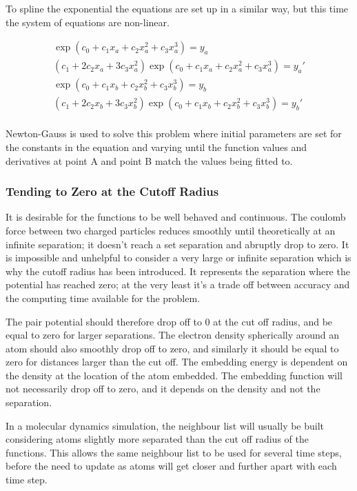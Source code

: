 To spline the exponential the equations are set up in a similar way, but this time the system of equations are non-linear.

\begin{equation}
\begin{split}
\exp(c_0 + c_1 x_a + c_2 x_a^2 + c_3 x_a^3) = y_a \\
(c_1 + 2 c_2 x_a + 3 c_3 x_a^2)\exp(c_0 + c_1 x_a + c_2 x_a^2 + c_3 x_a^3) = y_a' \\
\exp(c_0 + c_1 x_b + c_2 x_b^2 + c_3 x_b^3) = y_b \\
(c_1 + 2 c_2 x_b + 3 c_3 x_b^2)\exp(c_0 + c_1 x_b + c_2 x_b^2 + c_3 x_b^3) = y_b' \\
\end{split}
\label{eq:cubicExpSpline}
\end{equation}

Newton-Gauss is used to solve this problem where initial parameters are set for the constants in the equation and varying until the function values and derivatives at point A and point B match the values being fitted to.


\subsubsection{Tending to Zero at the Cutoff Radius}
\label{section:tendingtozero}

It is desirable for the functions to be well behaved and continuous.  The coulomb force between two charged particles reduces smoothly until theoretically at an infinite separation; it doesn't reach a set separation and abruptly drop to zero.  It is impossible and unhelpful to consider a very large or infinite separation which is why the cutoff radius has been introduced.  It represents the separation where the potential has reached zero; at the very least it's a trade off between accuracy and the computing time available for the problem.

The pair potential should therefore drop off to 0 at the cut off radius, and be equal to zero for larger separations.  The electron density spherically around an atom should also smoothly drop off to zero, and similarly it should be equal to zero for distances larger than the cut off.  The embedding energy is dependent on the density at the location of the atom embedded.  The embedding function will not necessarily drop off to zero, and it depends on the density and not the separation.

In a molecular dynamics simulation, the neighbour list will usually be built considering atoms slightly more separated than the cut off radius of the functions.  This allows the same neighbour list to be used for several time steps, before the need to update as atoms will get closer and further apart with each time step.  




